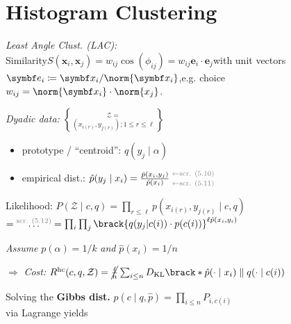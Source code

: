 \section{Histogram Clustering}

\emph{Least Angle Clust. (LAC): {\normalfont\sffamily[Idea]}}\\
Similarity\enspace $S(\symbf x_i, \symbf x_j) = w_{ij} \cos(\phi_{ij}) = w_{ij} \symbf e_i \cdot \symbf e_j$\enspace with unit vectors\enspace $\symbf e_i \coloneqq \symbf x_i / \norm{\symbf x_i}$,\enspace e.g. choice $w_{ij} = \norm{\symbf x_i} \cdot \norm{x_j}$.

\columnbreak
\emph{Dyadic data:}\enspace
$\mathcal Z = \brace{ (x_{i(r)}, y_{j(r)}) ; 1\leq r\leq \ell }$

\begin{itemize}
    \item prototype / ``centroid'':\enspace
        $q(y_j \mid \alpha)$
    \item empirical dist.:\enspace
        $\hat p(y_j\mid x_i)
        = \frac{\hat p(x_i, y_j)}{\hat p(x_i)}
        \:\substack{
            \color{gray} \leftarrow \text{scr. (5.10)} \\[2pt]
            \color{gray} \leftarrow \text{scr. (5.11)}
        }$

\end{itemize}

Likelihood:\enspace
$P(\mathcal Z\mid c,q) = \prod_{r\leq\ell} p(x_{i(r)}, y_{j(r)} \mid c,q)$\\\quad
$= \overset{\text{\color{gray} scr. (5.12)}}{\ldots}
= \prod_i \prod_j \brack{ q(y_j\vert c(i)) \cdot p(c(i)) }^{\ell \hat p(x_i, y_i)}$

\textit{Assume} $p(\alpha)=1/k$ \textit{and} $\hat p(x_i) = 1/n$

$\Rightarrow$ \emph{Cost:}
$R\ap{hc} (c, q, \mathcal Z) = \cancel{\frac{\ell}{n}} \sum_{i\leq n} D\ped{KL} \brack*{\hat p(\cdot\mid x_i) \parallel q(\cdot\mid c(i))}$

Solving the \textbf{Gibbs dist.} $p(c \mid q, \hat p) = \prod_{i\leq n} P_{i, c(i)}$\\
via Lagrange yields 
{\gray\scriptsize {}}

